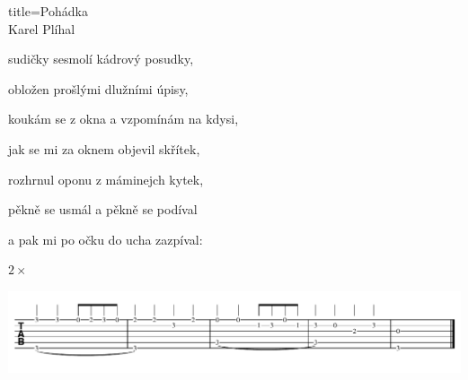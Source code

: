 \begin{song}{title=\predtitle\centering Pohádka \\\large Karel Plíhal\vspace*{-1.0cm}}
\begin{centerjustified}
sudičky sesmolí kádrový posudky,

obložen prošlými dlužními úpisy,

koukám se z okna a vzpomínám na kdysi,

jak se mi za oknem objevil skřítek,

rozhrnul oponu z máminejch kytek,

pěkně se usmál a pěkně se podíval

a pak mi po očku do ucha zazpíval:

 $2\times$

\hspace*{-1.5cm}
\includegraphics[scale=0.83]{../taby/pohadka.pdf}
\hspace*{-1.5cm}
\end{centerjustified}
\setcounter{Slokočet}{0}
\end{song}
